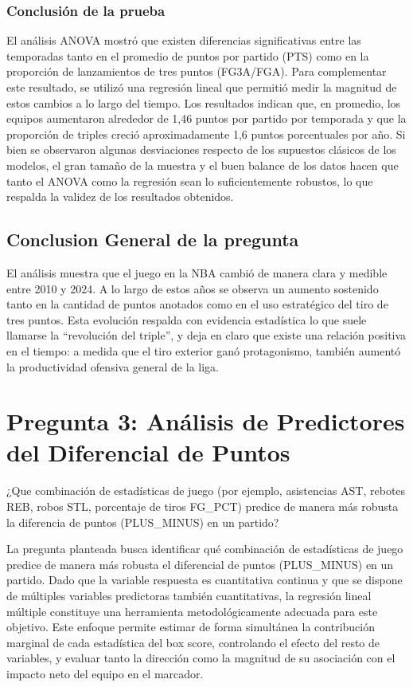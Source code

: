 \documentclass[12pt]{article}
\begin{document}
\subsubsection{Conclusión de la prueba}
El análisis ANOVA mostró que existen diferencias significativas entre las temporadas tanto en el promedio de puntos por partido (PTS) como en la proporción de lanzamientos de tres puntos (FG3A/FGA). Para complementar este resultado, se utilizó una regresión lineal que permitió medir la magnitud de estos cambios a lo largo del tiempo. Los resultados indican que, en promedio, los equipos aumentaron alrededor de 1,46 puntos por partido por temporada y que la proporción de triples creció aproximadamente 1,6 puntos porcentuales por año. Si bien se observaron algunas desviaciones respecto de los supuestos clásicos de los modelos, el gran tamaño de la muestra y el buen balance de los datos hacen que tanto el ANOVA como la regresión sean lo suficientemente robustos, lo que respalda la validez de los resultados obtenidos.

\subsection{Conclusion General de la pregunta}
El análisis muestra que el juego en la NBA cambió de manera clara y medible entre 2010 y 2024. A lo largo de estos años se observa un aumento sostenido tanto en la cantidad de puntos anotados como en el uso estratégico del tiro de tres puntos. Esta evolución respalda con evidencia estadística lo que suele llamarse la “revolución del triple”, y deja en claro que existe una relación positiva en el tiempo: a medida que el tiro exterior ganó protagonismo, también aumentó la productividad ofensiva general de la liga.

\section{Pregunta 3: Análisis de Predictores del Diferencial de Puntos}

\vspace{0.3cm}

¿Que combinación de estadísticas de juego (por ejemplo, asistencias AST, rebotes REB, robos STL, porcentaje de tiros FG\_PCT) predice de manera más robusta la diferencia de puntos (PLUS\_MINUS) en un partido?

\vspace{0.3cm}

La pregunta planteada busca identificar qué combinación de estadísticas de juego predice de manera más robusta el diferencial de puntos (PLUS\_MINUS) en un partido. Dado que la variable respuesta es cuantitativa continua y que se dispone de múltiples variables predictoras también cuantitativas, la regresión lineal múltiple constituye una herramienta metodológicamente adecuada para este objetivo. Este enfoque permite estimar de forma simultánea la contribución marginal de cada estadística del box score, controlando el efecto del resto de variables, y evaluar tanto la dirección como la magnitud de su asociación con el impacto neto del equipo en el marcador.
\end{document}
